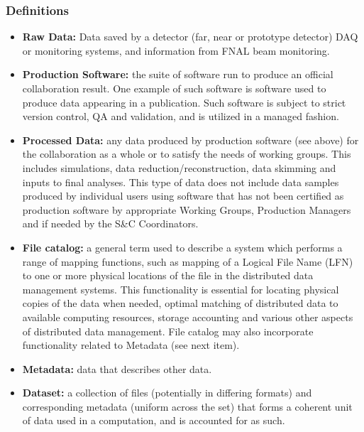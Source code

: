 \subsubsection{Definitions}
\begin{itemize}
\item \textbf{Raw Data:} Data saved by a detector (far, near or prototype detector) DAQ or monitoring systems, and information from FNAL beam monitoring.

\item \textbf{Production Software:} the suite of software run to produce an official collaboration result. One example of such software is software used to produce data appearing in a publication. Such software is subject to strict version control, QA and validation, and is utilized in a managed fashion.

\item \textbf{Processed Data:} any data produced by production software (see above) for the collaboration as a whole or to satisfy the needs of working groups.  This includes simulations, data reduction/reconstruction, data skimming and inputs to final analyses. This type of data does not include data samples produced by individual users using software that has not been certified as production software by appropriate Working Groups, Production Managers and if needed by the S\&C Coordinators.

\item \textbf{File catalog:} a general term used to describe a system which performs a range of mapping functions, such as mapping of a Logical File Name (LFN) to one or more physical locations of the file in the distributed data management systems. This functionality is essential for locating physical copies of the data when needed, optimal matching of distributed data to available computing resources, storage accounting and various other aspects of distributed data management. File catalog may also incorporate functionality related to Metadata (see next item).

\item \textbf{Metadata:} data that describes other data.

\item \textbf{Dataset:} a collection of files (potentially in differing formats) and corresponding metadata (uniform across the set) that forms a coherent unit of data used in a computation, and is accounted for as such.
\end{itemize}

